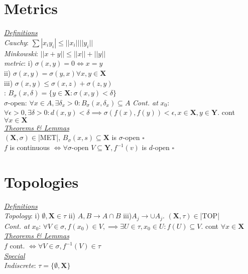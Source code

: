 \section{Metrics}
\underline{\emph{Definitions}}\\
\emph{Cauchy}: $\sum{|x_iy_i|}\leq||x_i||||y_i||$\\
\emph{Minkowski}: $||x+y||\leq||x||+||y||$\\
\emph{metric}: i) $\sigma(x,y)=0\iff x=y$\\
ii) $\sigma(x,y)=\sigma(y,x) \forall x,y\in \mathbf{X}$\\
iii) $\sigma(x,y)\leq\sigma(x,z)+\sigma(z,y)$\\
: $B_{\sigma}(x,\delta)=\{y\in\mathbf{X}:\sigma(x,y)<\delta\}$\\
$\sigma$-open: $\forall x\in A,\exists \delta_x>0:B_{\sigma}(x,\delta_x)\subseteq A$
\emph{Cont. at} $x_0$: $\forall\epsilon>0,\exists\delta>0:d(x,y)<\delta\implies\sigma(f(x),f(y))<\epsilon, x\in\mathbf{X},y\in\mathbf{Y}$. cont $\forall x\in\mathbf{X}$
\\\underline{\emph{Theorems \& Lemmas}}\\
$(\mathbf{X},\sigma)\in$|MET|, $B_{\sigma}(x,s)\subseteq\mathbf{X}$ is $\sigma$-open $\square$\\
$f$ is continuous $\iff\forall\sigma$-open $V\subseteq\mathbf{Y},f^{-1}(v)$ is $d$-open $\square$
\section{Topologies}
\underline{\emph{Definitions}}\\
\emph{Topology}: i) $\emptyset,\mathbf{X}\in\tau$ ii) $A,B\to A\cap B$ iii)$A_j\to \cup A_j$. $(\mathbf{X},\tau)\in$|TOP|\\
\emph{Cont. at} $x_0$: $\forall V\in\sigma,f(x_0)\in V,\implies\exists U\in\tau,x_0\in U:f(U)\subseteq V$. cont $\forall x\in\mathbf{X}$
\\\underline{\emph{Theorems \& Lemmas}}\\
$f$ cont. $\iff\forall V\in\sigma,f^{-1}(V)\in\tau$\square
\\\underline{\emph{Special}}\\
\emph{Indiscrete}: $\tau=\{\emptyset,\mathbf{X}\}$
